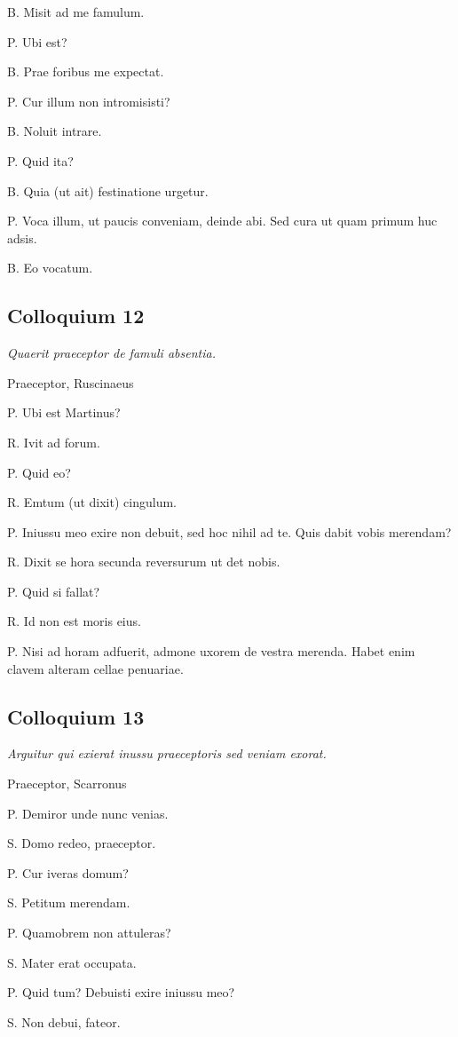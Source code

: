 \documentclass{article}
\begin{document}
B. Misit ad me famulum.

P. Ubi est?

B. Prae foribus me expectat.

P. Cur illum non intromisisti?

B. Noluit intrare.

P. Quid ita?

B. Quia (ut ait) festinatione urgetur.

P. Voca illum, ut paucis conveniam, deinde abi. Sed cura ut quam primum huc adsis.

B. Eo vocatum.

\subsection{Colloquium 12}
\emph{Quaerit praeceptor de famuli absentia.}

Praeceptor, Ruscinaeus

P. Ubi est Martinus?

R. Ivit ad forum.

P. Quid eo?

R. Emtum (ut dixit) cingulum.

P. Iniussu meo exire non debuit, sed hoc nihil ad te. Quis dabit vobis merendam?

R. Dixit se hora secunda reversurum ut det nobis.

P. Quid si fallat?

R. Id non est moris eius.

P. Nisi ad horam adfuerit, admone uxorem de vestra merenda. Habet enim clavem alteram cellae penuariae.

\subsection{Colloquium 13}
\emph{Arguitur qui exierat inussu praeceptoris sed veniam exorat.}

Praeceptor, Scarronus

P. Demiror unde nunc venias.

S. Domo redeo, praeceptor.

P. Cur iveras domum?

S. Petitum merendam.

P. Quamobrem non attuleras?

S. Mater erat occupata.

P. Quid tum? Debuisti exire iniussu meo?

S. Non debui, fateor.
\end{document}
